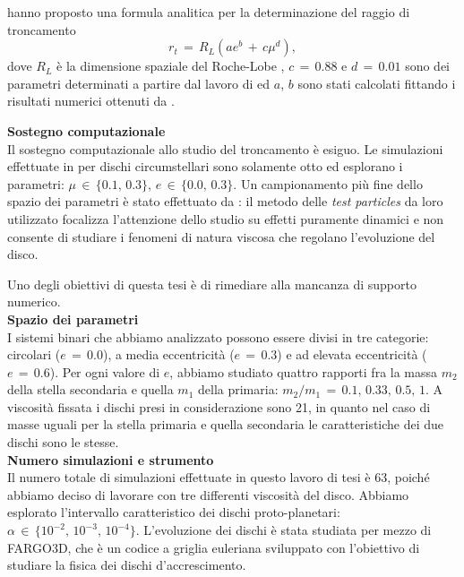 \documentclass[12pt, a4paper]{report}
\begin{document}
\cite{ManaraTronc2019} hanno proposto una formula analitica per la determinazione del raggio di troncamento
\begin{equation}
r_t\,=\,R_{L} (a e^b\,+\,c\mu^d),
\label{eq:tronc_disc}
\end{equation}
dove $R_L$ è la dimensione spaziale del Roche-Lobe \parencite{Eggleton1983}, $c\,=\,0.88$ e $d\,=\,0.01$ sono dei parametri determinati a partire dal lavoro di \cite{PapaloizouPringle1977} ed $a$, $b$ sono stati calcolati fittando i risultati numerici ottenuti da \cite{ArtymowiczLubow1994}.

\textbf{Sostegno computazionale}\\

Il sostegno computazionale allo studio del troncamento è esiguo. 
Le simulazioni effettuate in \cite{ArtymowiczLubow1994} per dischi circumstellari sono solamente otto ed esplorano i parametri: $\mu\,\in\,\{0.1,\,0.3\}$, $e\,\in\,\{0.0,\,0.3\}$.
Un campionamento più fine dello spazio dei parametri è stato effettuato da \cite{Pichardo2005}: il metodo delle \textit{test particles} da loro utilizzato focalizza l'attenzione dello studio su effetti puramente dinamici e non consente di studiare i fenomeni di natura viscosa che regolano l'evoluzione del disco.

Uno degli obiettivi di questa tesi è di rimediare alla mancanza di supporto numerico.\\

\textbf{Spazio dei parametri} \\

I sistemi binari che abbiamo analizzato possono essere divisi in tre categorie: circolari ($e\,=\,0.0$), a media eccentricità ($e\,=\,0.3$) e ad elevata eccentricità ($e\,=\,0.6$).
Per ogni valore di $e$, abbiamo studiato quattro rapporti fra la massa $m_2$ della stella secondaria e quella $m_1$ della primaria: $m_2/m_1\,=\,0.1,\,0.33,\,0.5,\,1$.
A viscosità fissata i dischi presi in considerazione sono 21, in quanto nel caso di masse uguali per la stella primaria e quella secondaria le caratteristiche dei due dischi sono le stesse.\\

\textbf{Numero simulazioni e strumento}\\

Il numero totale di simulazioni effettuate in questo lavoro di tesi è 63, poiché abbiamo deciso di lavorare con tre differenti viscosità del disco.
Abbiamo esplorato l'intervallo caratteristico dei dischi proto-planetari: $\alpha\,\in\,\{10^{-2},\, 10^{-3},\,10^{-4}\}$.
L'evoluzione dei dischi è stata studiata per mezzo di FARGO3D, che è un codice a griglia euleriana sviluppato con l'obiettivo di studiare la fisica dei dischi d'accrescimento.\\
\end{document}

